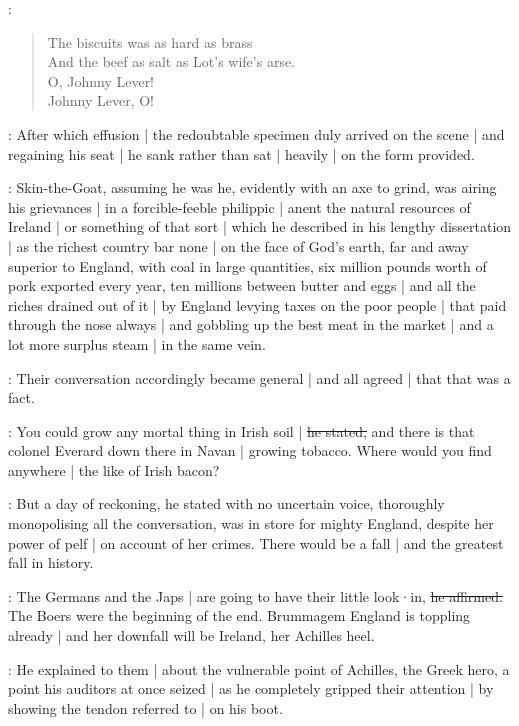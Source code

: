 \Murphy:
    \begin{verse}
      The biscuits was as hard as brass\\
      And the beef as salt as Lot's wife's arse.%
\\
      O, Johnny Lever!\\
      Johnny Lever, O!
    \end{verse}

:
After which effusion |
the redoubtable specimen duly arrived on the scene |
and regaining his seat |
he sank rather than sat |
heavily |
on the form provided.

:
Skin-the-Goat,
assuming he was he,
evidently with an axe to grind,
was airing his grievances |
in a forcible-feeble philippic |
anent the natural resources of Ireland |
or something of that sort |
which he described in his lengthy dissertation |
as the richest country bar none |
on the face of God's earth,
far and away superior to England,
with coal in large quantities,
six million pounds worth of pork exported every year,%
ten millions between butter and eggs |
and all the riches drained out of it |
by England levying taxes on the poor people |
that paid through the nose always |
and gobbling up the best meat in the market |
and a lot more surplus steam |
in the same vein.

:
Their conversation accordingly became general |
and all agreed |
that that was a fact.

\SkinTheGoat:
You could grow any mortal thing in Irish soil |
\sout{he stated,}
and there is that colonel Everard down there in Navan |
growing tobacco.
Where would you find anywhere |
the like of Irish bacon?

:
But a day of reckoning,
he stated  with no uncertain voice,
thoroughly monopolising all the conversation,
was in store for mighty England,
despite her power of pelf |
on account of her crimes.
There would be a fall |
and the greatest fall
in history.

\SkinTheGoat:
The Germans and the Japs |
are going to have their little look·in,
\sout{he affirmed.}
The Boers were the beginning of the end.
Brummagem England is toppling already |
and her downfall will be Ireland,
her Achilles heel.

:
He explained to them |
about the vulnerable point of Achilles,
the Greek hero,
a point his auditors at once seized |
as he completely gripped their attention |
by showing the tendon referred to |
on his boot.

